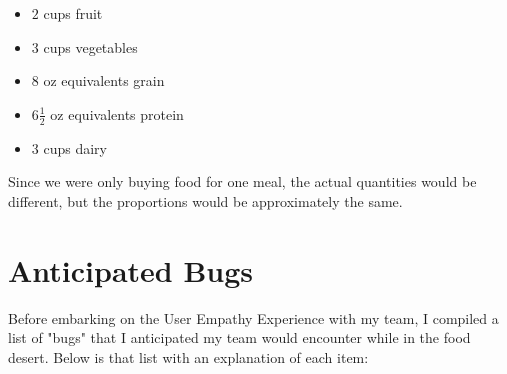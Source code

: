 \documentclass[11pt]{article}
\begin{document}
\begin{itemize}[noitemsep]
    \item $2$ cups fruit
    \item $3$ cups vegetables
    \item $8$ oz equivalents grain
    \item $6\frac{1}{2}$ oz equivalents protein
    \item $3$ cups dairy
\end{itemize}

Since we were only buying food for one meal, the actual quantities would be different, but the
proportions would be approximately the same.

\section{Anticipated Bugs}
Before embarking on the User Empathy Experience with my team, I compiled a list of "bugs" that I
anticipated my team would encounter while in the food desert. Below is that list with an explanation
of each item:
\end{document}
